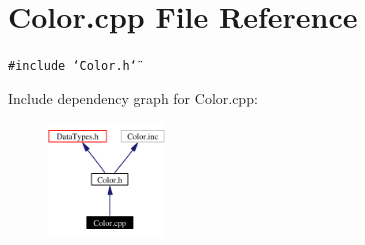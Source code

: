 \section{Color.cpp File Reference}
\label{Color_8cpp}
{\tt \#include \char`\"{}Color.h\char`\"{}}\par


Include dependency graph for Color.cpp:\begin{figure}[H]
\begin{center}
\leavevmode
\includegraphics[width=88pt]{Color_8cpp__incl}
\end{center}
\end{figure}
